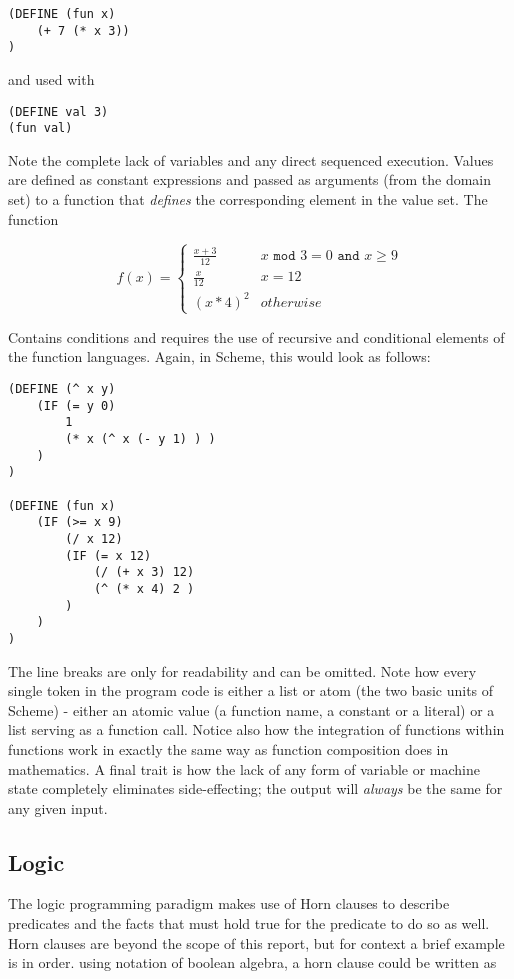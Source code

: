 \begin{lstlisting}
(DEFINE (fun x)
    (+ 7 (* x 3))
)
\end{lstlisting}

and used with 

\begin{lstlisting}
(DEFINE val 3)
(fun val)
\end{lstlisting}

Note the complete lack of variables and any direct sequenced execution. Values are defined as constant expressions and passed as arguments (from the domain set) to a function that \emph{defines} the corresponding element in the value set. The function

\[
f(x) =
\begin{cases} \frac{x+3}{12} & x \texttt{ mod } 3 = 0 \texttt{ and } x \geq 9
\\
\frac{x}{12} & x = 12
\\
(x * 4)^2 & otherwise
\end{cases}
\]

Contains conditions and requires the use of recursive and conditional elements of the function languages. Again, in Scheme, this would look as follows:

\begin{lstlisting}
(DEFINE (^ x y)
    (IF (= y 0)
        1
        (* x (^ x (- y 1) ) )
    )
)

(DEFINE (fun x)
    (IF (>= x 9)
        (/ x 12)
        (IF (= x 12)
            (/ (+ x 3) 12)
            (^ (* x 4) 2 )
        )
    )
)           
\end{lstlisting}

The line breaks are only for readability and can be omitted. Note how every single token in the program code is either a list or atom (the two basic units of Scheme) - either an atomic value (a function name, a constant or a literal) or a list serving as a function call. Notice also how the integration of functions within functions work in exactly the same way as function composition does in mathematics. A final trait is how the lack of any form of variable or machine state completely eliminates side-effecting; the output will \emph{always} be the same for any given input.

\subsection{Logic}
The logic programming paradigm makes use of Horn clauses to describe predicates and the facts that must hold true for the predicate to do so as well. Horn clauses are beyond the scope of this report, but for context a brief example is in order. using notation of boolean algebra, a horn clause could be written as 

